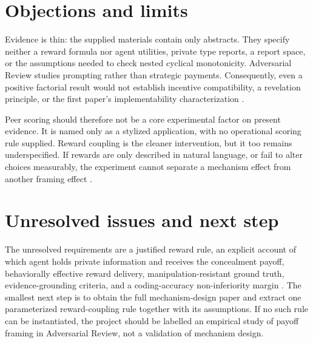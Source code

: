 \documentclass{article}
\begin{document}
\section{Objections and limits}

Evidence is thin: the supplied materials contain only abstracts.  They specify neither a reward formula nor agent utilities, private type reports, a report space, or the assumptions needed to check nested cyclical monotonicity.  Adversarial Review studies prompting rather than strategic payments.  Consequently, even a positive factorial result would not establish incentive compatibility, a revelation principle, or the first paper's implementability characterization .

Peer scoring should therefore not be a core experimental factor on present evidence.  It is named only as a stylized application, with no operational scoring rule supplied.  Reward coupling is the cleaner intervention, but it too remains underspecified.  If rewards are only described in natural language, or fail to alter choices measurably, the experiment cannot separate a mechanism effect from another framing effect .

\section{Unresolved issues and next step}

The unresolved requirements are a justified reward rule, an explicit account of which agent holds private information and receives the concealment payoff, behaviorally effective reward delivery, manipulation-resistant ground truth, evidence-grounding criteria, and a coding-accuracy non-inferiority margin .  The smallest next step is to obtain the full mechanism-design paper and extract one parameterized reward-coupling rule together with its assumptions.  If no such rule can be instantiated, the project should be labelled an empirical study of payoff framing in Adversarial Review, not a validation of mechanism design.
\end{document}
